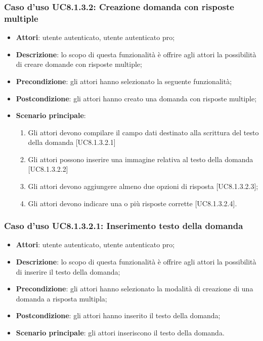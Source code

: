 \subsubsection{Caso d'uso UC8.1.3.2: Creazione domanda con risposte multiple}
	\begin{itemize}
		\item
			\textbf{Attori}: utente autenticato, utente autenticato pro;
		\item		
			\textbf{Descrizione}: lo scopo di questa funzionalità è offrire agli attori la possibilità di creare domande con risposte multiple;
		\item
			\textbf{Precondizione}: gli attori hanno selezionato la seguente funzionalità; 
		\item
			\textbf{Postcondizione}: gli attori hanno creato una domanda con risposte multiple;
		\item
			\textbf{Scenario principale}:
	       		\begin{enumerate}
	       			\item
	       			Gli attori devono compilare il campo dati destinato alla scrittura del testo della domanda [UC8.1.3.2.1]
	       			\item
	       			Gli attori possono inserire una immagine relativa al testo della domanda [UC8.1.3.2.2]
	       			\item
	       			Gli attori devono aggiungere almeno due opzioni di risposta [UC8.1.3.2.3];
					\item
					Gli attori devono indicare una o più risposte corrette [UC8.1.3.2.4].
	 			\end{enumerate}
	\end{itemize}

\subsubsection{Caso d'uso UC8.1.3.2.1: Inserimento testo della domanda}
	\begin{itemize}
		\item
			\textbf{Attori}: utente autenticato, utente autenticato pro;
		\item		
			\textbf{Descrizione}: lo scopo di questa funzionalità è offrire agli attori la possibilità di inserire il testo della domanda;
		\item
			\textbf{Precondizione}: gli attori hanno selezionato la modalità di creazione di una domanda a risposta multipla; 
		\item
			\textbf{Postcondizione}: gli attori hanno inserito il testo della domanda;
		\item
			\textbf{Scenario principale}: gli attori inseriscono il testo della domanda. 
	 			
	\end{itemize}
	
